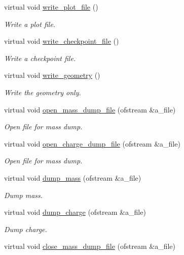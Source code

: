 \begin{DoxyCompactItemize}
virtual void \hyperlink{classplasma__engine_ab420eec8bd62cdf197329171b8d545df}{write\+\_\+plot\+\_\+file} ()
\begin{DoxyCompactList}\small\item\em Write a plot file. \end{DoxyCompactList}\item 
virtual void \hyperlink{classplasma__engine_a05d1e58e504f183436f35b5c6bfe64ca}{write\+\_\+checkpoint\+\_\+file} ()
\begin{DoxyCompactList}\small\item\em Write a checkpoint file. \end{DoxyCompactList}\item 
virtual void \hyperlink{classplasma__engine_a6442f4080571f3298fce1d59d7932885}{write\+\_\+geometry} ()
\begin{DoxyCompactList}\small\item\em Write the geometry only. \end{DoxyCompactList}\item 
virtual void \hyperlink{classplasma__engine_a07281bc7b590514f6b9ae15cbbb56b65}{open\+\_\+mass\+\_\+dump\+\_\+file} (ofstream \&a\+\_\+file)
\begin{DoxyCompactList}\small\item\em Open file for mass dump. \end{DoxyCompactList}\item 
virtual void \hyperlink{classplasma__engine_abf08e98071d6d27593d4f92335447c92}{open\+\_\+charge\+\_\+dump\+\_\+file} (ofstream \&a\+\_\+file)
\begin{DoxyCompactList}\small\item\em Open file for mass dump. \end{DoxyCompactList}\item 
virtual void \hyperlink{classplasma__engine_a967647acdc28b5121d12bfea474320ac}{dump\+\_\+mass} (ofstream \&a\+\_\+file)
\begin{DoxyCompactList}\small\item\em Dump mass. \end{DoxyCompactList}\item 
virtual void \hyperlink{classplasma__engine_abfa5a30c36fc78e0b5c49324e348b749}{dump\+\_\+charge} (ofstream \&a\+\_\+file)
\begin{DoxyCompactList}\small\item\em Dump charge. \end{DoxyCompactList}\item 
virtual void \hyperlink{classplasma__engine_afabc9281a9a32b3dfcb8023abc7a7870}{close\+\_\+mass\+\_\+dump\+\_\+file} (ofstream \&a\+\_\+file)

\end{DoxyCompactItemize}
